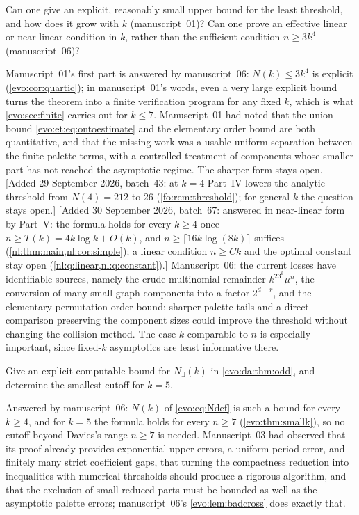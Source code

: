 \documentclass[11pt,a4paper]{article}
\numberwithin{equation}{section}
\theoremstyle{definition}
\theoremstyle{remark}
\begin{document}
\begin{question}\label{evo:q:threshold}
Can one give an explicit, reasonably small upper bound for the least
threshold, and how does it grow with $k$ (manuscript~01)? Can one prove an
effective linear or near-linear condition in $k$, rather than the sufficient
condition $n\ge3k^4$ (manuscript~06)?
\end{question}
Manuscript~01's first part is answered by manuscript~06: $N(k)\le3k^4$ is
explicit (\cref{evo:cor:quartic}); in manuscript~01's words, even a very
large explicit bound turns the theorem into a finite verification program for
any fixed $k$, which is what \cref{evo:sec:finite} carries out for $k\le7$.
Manuscript~01 had noted that the union bound \eqref{evo:et:eq:ontoestimate}
and the elementary order bound are both quantitative, and that the missing
work was a usable uniform separation between the finite palette terms, with a
controlled treatment of components whose smaller part has not reached the
asymptotic regime. The sharper form stays open. [Added 29 September 2026,
batch~43: at $k=4$ Part~IV lowers the analytic threshold from $N(4)=212$ to
$26$ (\cref{fo:rem:threshold}); for general $k$ the question stays open.] [Added 30 September 2026, batch~67: answered in near-linear form by Part~V: the formula holds
for every $k\ge4$ once $n\ge T(k)=4k\log k+O(k)$, and
$n\ge\lceil16k\log(8k)\rceil$ suffices (\cref{nl:thm:main,nl:cor:simple});
a linear condition $n\ge Ck$ and the optimal constant stay open
(\cref{nl:q:linear,nl:q:constant}).]
Manuscript~06: the current
losses have identifiable sources, namely the crude multinomial remainder
$k^23^k\mu^n$, the conversion of many small graph components into a factor
$2^{d+r}$, and the elementary permutation-order bound; sharper palette tails
and a direct comparison preserving the component sizes could improve the
threshold without changing the collision method. The case $k$ comparable to
$n$ is especially important, since fixed-$k$ asymptotics are least
informative there.

\begin{question}\label{evo:q:oddcutoff}
Give an explicit computable bound for $N_\exists(k)$ in
\cref{evo:da:thm:odd}, and determine the smallest cutoff for $k=5$.
\end{question}
Answered by manuscript~06: $N(k)$ of \eqref{evo:eq:Ndef} is such a bound for
every $k\ge4$, and for $k=5$ the formula holds for every $n\ge7$
(\cref{evo:thm:smallk}), so no cutoff beyond Davies's range $n\ge7$ is
needed. Manuscript~03 had observed that its proof already provides exponential
upper errors, a uniform period error, and finitely many strict coefficient
gaps, that turning the compactness reduction into inequalities with numerical
thresholds should produce a rigorous algorithm, and that the exclusion of
small reduced parts must be bounded as well as the asymptotic palette errors;
manuscript~06's \cref{evo:lem:badcross} does exactly that.
\end{document}
